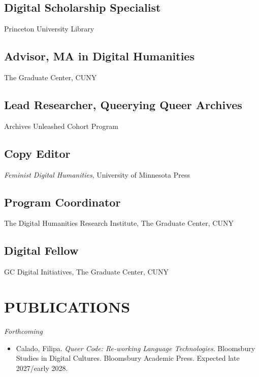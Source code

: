 \documentclass[a4paper,11pt]{article}
\begin{document}
\subsection*{Digital Scholarship Specialist  \hfill{}   }
\label{sec:org773ebf9}
Princeton University Library

\subsection*{Advisor, MA in Digital Humanities \hfill{}   }
\label{sec:org184675b}
The Graduate Center, CUNY
\subsection*{Lead Researcher, Queerying Queer Archives  \hfill{}   }
\label{sec:org6d86913}
Archives Unleashed Cohort Program
\subsection*{Copy Editor  \hfill{}   }
\label{sec:org952d98c}
\emph{Feminist Digital Humanities}, University of Minnesota Press
\subsection*{Program Coordinator  \hfill{}   }
\label{sec:org6a55099}
The Digital Humanities Research Institute, The Graduate Center,
CUNY
\subsection*{Digital Fellow  \hfill{}   }
\label{sec:orgf15160f}
GC Digital Initiatives, The Graduate Center, CUNY

\section*{PUBLICATIONS}
\label{sec:orgcaeb19d}

\emph{Forthcoming}
\begin{itemize}
\item Calado, Filipa. \emph{Queer Code: Re-working Language Technologies}.
Bloomsbury Studies in Digital Cultures. Bloomsbury Academic Press.
Expected late 2027/early 2028.
\end{itemize}
\end{document}
